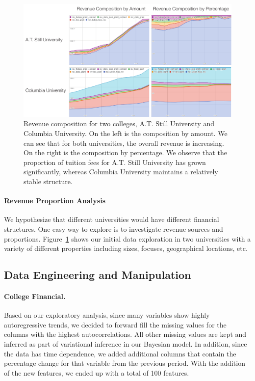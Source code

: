 \documentclass[11pt,letter]{article}
\begin{document}
\begin{figure}[H]
\centering
\includegraphics[width=\linewidth]{data-explore.pdf}
\caption{Revenue composition for two colleges, A.T. Still University and Columbia University. On the left is  the composition by amount. We can see that for both universities, the overall revenue is increasing. On the right is the composition by percentage. 
We observe that the proportion of tuition fees for A.T. Still University has grown significantly, whereas Columbia University maintains a relatively stable structure. 
}
\label{fig:data_explore}
\end{figure}

\paragraph{Revenue Proportion Analysis} We hypothesize that different universities would have different financial structures. One easy way to explore is to investigate revenue sources and proportions. Figure~\ref{fig:data_explore} shows our initial data exploration in two universities with a variety of 
 different properties including sizes, focuses, geographical locations, etc.


\subsection{Data Engineering and Manipulation}
\paragraph{College Financial.}
Based on our exploratory analysis, since many variables show highly autoregressive trends, we decided to forward fill the missing values for the columns with the highest autocorrelations. All other missing values are kept and inferred as part of variational inference in our Bayesian model. In addition, since the data has time dependence, we added additional columns that contain the percentage change for that variable from the previous period. With the addition of the new features, we ended up with a total of 100 features. 
\end{document}
